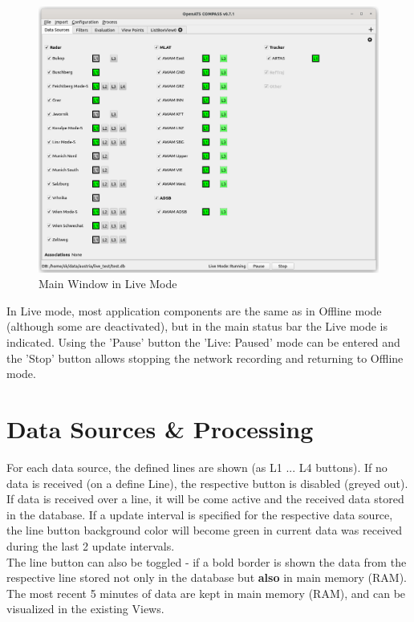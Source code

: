 \begin{figure}[H]
  \hspace*{-2.5cm}
    \includegraphics[width=19cm]{figures/live_mode.png}
  \caption{Main Window in Live Mode}
\end{figure}

In Live mode, most application components are the same as in Offline mode (although some are deactivated), but in the main status bar the Live mode is indicated. Using the 'Pause' button the 'Live: Paused' mode can be entered and the 'Stop' button allows stopping the network recording and returning to Offline mode.

\section{Data Sources \& Processing}

For each data source, the defined lines are shown (as L1 ... L4 buttons). If no data is received (on a define Line), the respective button is disabled (greyed out). If data is received over a line, it will be come active and the received data stored in the database. If a update interval is specified for the respective data source, the line button background color will become green in current data was received during the last 2 update intervals. \\

The line button can also be toggled - if a bold border is shown the data from the respective line stored not only in the database but \textbf{also} in main memory (RAM). The most recent 5 minutes of data are kept in main memory (RAM), and can be visualized in the existing Views. \\

